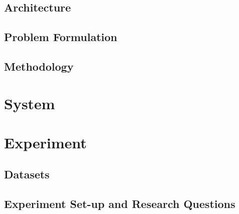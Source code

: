 \begin{Abstract}
\subsection{Architecture}

\subsection{Problem Formulation}


\subsection{Methodology}

\section{System}

\section{Experiment}

\subsection{Datasets}

\subsection{Experiment Set-up and Research Questions}


\end{Abstract}
